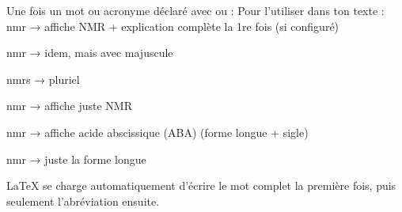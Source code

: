 


\printglossary[
  type=\acronymtype,
  title=Acronymes,
  toctitle=Acronymes %
]

\printglossary[
  title=Glossaire,
  toctitle=Glossaire %
]

Une fois un mot ou acronyme déclaré avec \newglossaryentry ou \newacronym :
Pour l’utiliser dans ton texte :
\gls{nmr} → affiche NMR + explication complète la 1re fois (si configuré)

\Gls{nmr} → idem, mais avec majuscule

\glspl{nmr} → pluriel

\acrshort{nmr} → affiche juste NMR

\acrfull{nmr} → affiche acide abscissique (ABA) (forme longue + sigle)

\acrlong{nmr} → juste la forme longue

LaTeX se charge automatiquement d’écrire le mot complet la première fois, puis seulement l’abréviation ensuite.